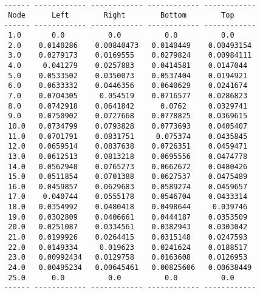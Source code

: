 \begin{lstlisting}
 ------ ------------ ------------ ------------ ------------
  Node      Left        Right        Bottom        Top     
 ------ ------------ ------------ ------------ ------------
  1.0       0.0          0.0          0.0          0.0
  2.0    0.0140286    0.00840473   0.0140449    0.00493154
  3.0    0.0279173    0.0169555    0.0279824    0.00984111
  4.0     0.041279    0.0257883    0.0414581    0.0147044
  5.0    0.0533502    0.0350073    0.0537404    0.0194921
  6.0    0.0633332    0.0446356    0.0640629    0.0241674
  7.0    0.0704305     0.054519    0.0716577    0.0286823
  8.0    0.0742918    0.0641842      0.0762     0.0329741
  9.0    0.0750902    0.0727668    0.0778825    0.0369615
  10.0   0.0734799    0.0793828    0.0773693    0.0405407
  11.0   0.0701791    0.0831751     0.075374    0.0435845
  12.0   0.0659514    0.0837638    0.0726351    0.0459471
  13.0   0.0612513    0.0813218    0.0695556    0.0474778
  14.0   0.0562948    0.0765273    0.0662672    0.0480426
  15.0   0.0511854    0.0701388    0.0627537    0.0475489
  16.0   0.0459857    0.0629683    0.0589274    0.0459657
  17.0    0.040744    0.0555178    0.0546704    0.0433314
  18.0   0.0354992    0.0480418    0.0498644     0.039746
  19.0   0.0302809    0.0406661    0.0444187    0.0353509
  20.0   0.0251087    0.0334561    0.0382943    0.0303042
  21.0   0.0199926    0.0264415    0.0315148    0.0247593
  22.0   0.0149334     0.019623    0.0241624    0.0188517
  23.0   0.00992434   0.0129758    0.0163608    0.0126953
  24.0   0.00495234   0.00645461   0.00825606   0.00638449
  25.0      0.0          0.0          0.0          0.0
 ------ ------------ ------------ ------------ ------------
\end{lstlisting}